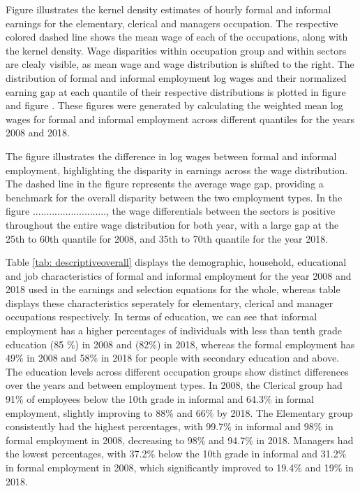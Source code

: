             
   
Figure  illustrates the kernel density estimates of hourly formal and informal earnings for the elementary, clerical and managers occupation. The respective colored dashed line shows the mean wage of each of the occupations, along with the kernel density. Wage disparities within occupation group and within sectors are clealy visible, as mean wage and wage distribution is shifted to the right. The distribution of formal and informal employment log wages and their normalized earning gap at each quantile of their respective distributions is plotted in figure  and figure . These figures were generated by calculating the weighted mean log wages for formal and informal employment across different quantiles for the years 2008 and 2018. 

	
 The figure illustrates the difference in log wages between formal and informal employment, highlighting the disparity in earnings across the wage distribution. The dashed line in the figure  represents the average wage gap, providing a benchmark for the overall disparity between the two employment types. In the figure ..........................., the wage differentials between the sectors is positive throughout the entire wage distribution for both year, with a large gap at the 25th to 60th quantile for 2008, and 35th to 70th quantile for the year 2018. 

 Table \ref{tab: descriptiveoverall} displays the demographic, household, educational and job characteristics of formal and informal employment for the year 2008 and 2018 used in the earnings and selection equations for the whole, whereas table  displays these characteristics seperately for elementary, clerical and manager occupations respectively.  In terms of education, we can see that informal employment has a higher percentages of individuals with less than tenth grade education (85 \%) in 2008 and (82\%) in 2018, whereas the formal employment has 49\% in 2008 and 58\%  in 2018 for people with secondary education and above. The education levels across different occupation groups show distinct differences over the years and between employment types. In 2008, the Clerical group had 91\% of employees below the 10th grade in informal and 64.3\% in formal employment, slightly improving to 88\% and 66\% by 2018. The Elementary group consistently had the highest percentages, with 99.7\% in informal and 98\% in formal employment in 2008, decreasing to 98\% and 94.7\% in 2018. Managers had the lowest percentages, with 37.2\% below the 10th grade in informal and 31.2\% in formal employment in 2008, which significantly improved to 19.4\% and 19\% in 2018. 

